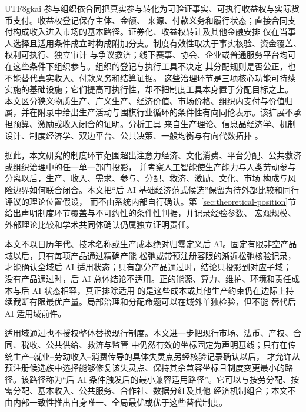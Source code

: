 \documentclass[12pt,a4paper,openany]{report}
\begin{document}
\begin{CJK*}{UTF8}{gkai}
参与组织依合同把真实参与转化为可验证事实、可执行收益权与实际货币支付。收益权登记保存主体、金额、
来源、付款义务和履行状态；直接合同支付构成收入进入市场的基本路径。证券化、收益权转让及其他金融安排
仅在当事人选择且适用条件成立时构成附加分支。制度有效性取决于事实核验、资金覆盖、权利可执行、独立审计
与争议救济；线下赛事、协会、企业或普通服务平台均可在这些条件下组织参与。组织的登记与执行工具不决定
其分配规则是否公正，也不能替代真实收入、付款义务和结算证据。
这些治理环节是三项核心功能可持续实施的基础设施；它们提高可执行性，却不把制度工具本身置于分配目标之上。
本文区分狭义物质生产、广义生产、经济价值、市场价格、组织内支付与价值归属，并在附录中给出生产活动与围棋行业循环的条件性有向同伦表示。该扩展不承担预算、激励或收入闭合的证明。分析工具
来自生产理论、信息品经济学、机制设计、制度经济学、双边平台、公共决策、一般均衡与有向代数拓扑
\cite{AcemogluRestrepo2019,Varian1998InformationGoods,Myerson1981OptimalAuction,
Coase1937Firm,North1990Institutions,RochetTirole2003TwoSided,ArrowDebreu1954Equilibrium,Grandis2003}。

据此，本文研究的制度环节范围超出注意力经济、文化消费、平台分配、公共救济或组织治理中的任一单一部门投影，
并考察人工智能使生产能力与人类劳动参与分离以后，生产、收入、需求、参与、分配、救济、激励、文化、市场
构成与风险边界如何联合闭合。本文把“后 AI 基础经济范式候选”保留为待外部比较和同行评议的理论位置假设，
而不由系统内部自行确认。第~\ref{sec:theoretical-position}节给出声明制度环节覆盖与不可约性的条件性判据，并记录经验参数、
宏观规模、外部理论比较和学术共同体确认仍属独立证明责任。

本文不以日历年代、技术名称或生产成本绝对归零定义后 AI。固定有限非空产品域以后，只有每项产品通过精确产能
松弛或带预注册容限的渐近松弛核验记录，才能确认全域后 AI 适用状态；只有部分产品通过时，结论只投影到对应子域；
没有产品通过时，后 AI 总体结论不适用。正的能源、算力、维护、环境和责任成本与后 AI 状态相容，真正排除适用
的是这些成本或其他生产约束仍在边际上持续截断有限最优产量。局部治理和分配命题可以在域外单独检验，但不能
替代后 AI 适用域前件。

适用域通过也不授权整体替换现行制度。本文进一步把现行市场、法币、产权、合同、税收、公共供给、救济与监管
中仍然有效的坐标固定为声明基线；只有在传统生产--就业--劳动收入--消费传导的具体失灵点另经核验记录确认以后，
才允许从预注册候选族中选择能够修复该失灵点、保持其余兼容坐标且制度变更最小的路径。该路径称为“后 AI
条件触发后的最小兼容适用路径”。它可以与按劳分配、按需分配、基本收入、公共服务、合作社、数据分红及其他
经济机制组合；本文不由内部一致性推出自身唯一、全局最优或优于这些替代制度。


\end{CJK*}
\end{document}
